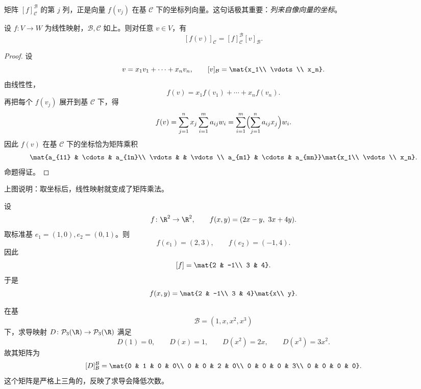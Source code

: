 \begin{remark}
矩阵 $[f]_{\mathcal C}^{\mathcal B}$ 的第 $j$ 列，正是向量 $f(v_j)$ 在基 $\mathcal C$ 下的坐标列向量。这句话极其重要：\emph{列来自像向量的坐标}。
\end{remark}

\begin{proposition}
设 $f\colon V\to W$ 为线性映射，$\mathcal B,\mathcal C$ 如上。则对任意 $v\in V$，有
\[
  [f(v)]_{\mathcal C}=[f]_{\mathcal C}^{\mathcal B}[v]_{\mathcal B}.
\]
\end{proposition}

\begin{proof}
设
\[
  v=x_1v_1+\cdots+x_nv_n,
  \qquad
  [v]_{\mathcal B}=\mat{x_1\\ \vdots\\ x_n}.
\]
由线性性，
\[
  f(v)=x_1f(v_1)+\cdots+x_nf(v_n).
\]
再把每个 $f(v_j)$ 展开到基 $\mathcal C$ 下，得
\[
  f(v)=\sum_{j=1}^n x_j\sum_{i=1}^m a_{ij}w_i
  =\sum_{i=1}^m\Bigl(\sum_{j=1}^n a_{ij}x_j\Bigr)w_i.
\]
因此 $f(v)$ 在基 $\mathcal C$ 下的坐标恰为矩阵乘积
\[
  \mat{a_{11} & \cdots & a_{1n}\\ \vdots & & \vdots\\ a_{m1} & \cdots & a_{mn}}
  \mat{x_1\\ \vdots\\ x_n}.
\]
命题得证。
\end{proof}

\begin{center}
\end{center}

上图说明：取坐标后，线性映射就变成了矩阵乘法。

\begin{example}[标准基下的矩阵]
设
\[
  f\colon \R^2\to\R^2,
  \qquad
  f(x,y)=(2x-y,\ 3x+4y).
\]
取标准基 $e_1=(1,0),e_2=(0,1)$。则
\[
  f(e_1)=(2,3),\qquad f(e_2)=(-1,4).
\]
因此
\[
  [f]=\mat{2 & -1\\ 3 & 4}.
\]
于是
\[
  f(x,y)=\mat{2 & -1\\ 3 & 4}\mat{x\\ y}.
\]
\end{example}

\begin{example}[求导算子的矩阵]
在基
\[
  \mathcal B=(1,x,x^2,x^3)
\]
下，求导映射 $D\colon \mathcal P_3(\R)\to\mathcal P_3(\R)$ 满足
\[
  D(1)=0,\qquad D(x)=1,\qquad D(x^2)=2x,\qquad D(x^3)=3x^2.
\]
故其矩阵为
\[
  [D]_{\mathcal B}^{\mathcal B}=
  \mat{0 & 1 & 0 & 0\\
       0 & 0 & 2 & 0\\
       0 & 0 & 0 & 3\\
       0 & 0 & 0 & 0}.
\]
这个矩阵是严格上三角的，反映了求导会降低次数。
\end{example}

